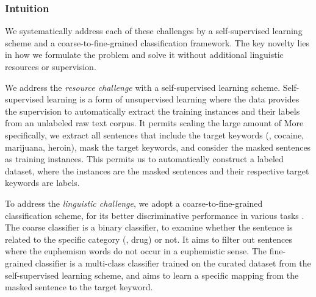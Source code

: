 \subsubsection{Intuition}
\label{sec:intuition}
We systematically address each of these challenges by a self-supervised learning scheme and a coarse-to-fine-grained classification framework. 
The key novelty lies in how we formulate the problem and solve it without additional linguistic resources or supervision. 

We address the \textit{resource challenge} with a self-supervised learning scheme. 
Self-supervised learning is a form of unsupervised learning where the data provides the supervision to automatically extract the training instances and their labels from an unlabeled raw text corpus. It permits scaling the large amount of 
More specifically, we extract all sentences that include the target keywords (\eg, cocaine, marijuana, heroin), mask the target keywords, and consider the masked sentences as training instances. 
This permits us to automatically construct a labeled dataset, where the instances are the masked sentences and their respective target keywords are labels. 

To address the \textit{linguistic challenge}, we adopt a coarse-to-fine-grained classification scheme, for its better discriminative performance in various tasks \cite{huo2019coarse,liu2018global,li2019exploiting}. 
The coarse classifier is a binary classifier, to examine whether the sentence is related to the specific category (\eg, drug) or not. 
It aims to filter out sentences where the euphemism words do not occur in a euphemistic sense. 
The fine-grained classifier is a multi-class classifier trained on the curated dataset from the self-supervised learning scheme, and aims to learn a specific mapping from the masked sentence to the target keyword. 



